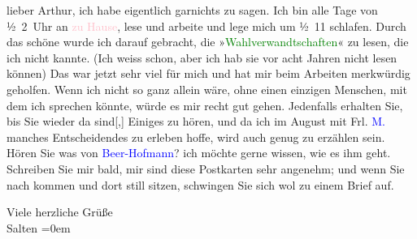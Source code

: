 \pstart
           lieber Arthur, ich habe eigentlich garnichts zu sagen.
               Ich bin alle Tage von ½ 2 Uhr an \textcolor{pink}{zu Hause}{}\ledrightnote{{$\rightarrow$}\textcolor{pink}{Hörlgasse}}, lese und arbeite und lege mich um ½ 11
               schlafen. Durch das schöne \label{K_L03174-1v}\label{K_L03174-1h} wurde ich darauf gebracht, die »\textcolor{green}{Wahlverwandtschaften}{}\ledrightnote{\textcolor{green}{Die Wahlverwandtschaften}}« zu lesen, die ich nicht kannte. (Ich
               weiss schon, aber ich hab sie vor acht Jahren nicht lesen können) Das war jetzt sehr
               viel für mich und hat mir beim Arbeiten merkwürdig geholfen. Wenn ich nicht so ganz
               allein wäre, ohne einen einzigen Menschen, mit dem ich sprechen könnte, würde es mir
               recht gut gehen. Jedenfalls erhalten Sie, bis Sie wieder da
                  sind{[},{]} Einiges zu hören, und da ich im August mit Frl. \textcolor{blue}{M.}{}\ledrightnote{\textcolor{blue}{Ottilie Salten}} manches
               Entscheidendes zu erleben hoffe, wird auch genug zu erzählen sein. Hören Sie was von
                  \textcolor{blue}{Beer-Hofmann}{}\ledrightnote{\textcolor{blue}{Richard Beer-Hofmann}}? ich möchte gerne wissen, wie
               es ihm geht. Schreiben {\pb}Sie mir
               bald, mir sind diese Postkarten sehr angenehm; und wenn Sie nach \label{K_L03174-2v}\label{K_L03174-2h} kommen und dort still sitzen, schwingen Sie sich wol zu einem Brief auf.\pend
           
\pstart
           Viele herzliche Grüße {\\[\baselineskip]}\spacefill\mbox{Salten}\pend
           \leftskip=0em{}\endnumbering{}  
      